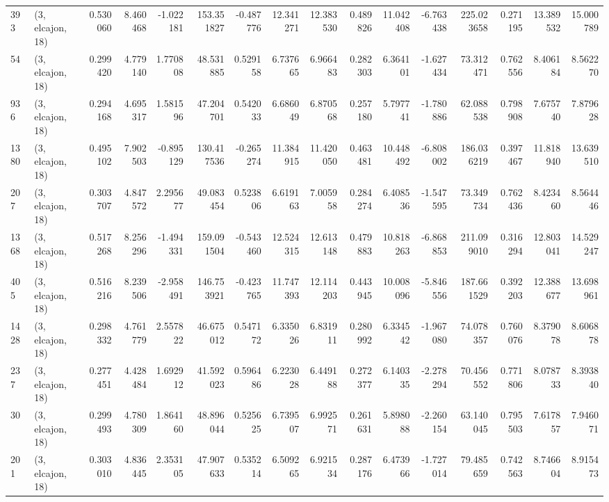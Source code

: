\begin{tabular}{llrrrrrrrrrrrrrr}
393  &  (3, elcajon, 18) &   0.530060 &   8.460468 &  -1.022181 &    153.351827 &   -0.487776 &   12.341271 &   12.383530 &  0.489826 &  11.042408 &  -6.763438 &   225.023658 &   0.271195 &  13.389532 &  15.000789 \\
54   &  (3, elcajon, 18) &   0.299420 &   4.779140 &   1.770808 &     48.531885 &    0.529158 &    6.737665 &    6.966483 &  0.282303 &   6.364101 &  -1.627434 &    73.312471 &   0.762556 &   8.406184 &   8.562270 \\
936  &  (3, elcajon, 18) &   0.294168 &   4.695317 &   1.581596 &     47.204701 &    0.542033 &    6.686049 &    6.870568 &  0.257180 &   5.797741 &  -1.780886 &    62.088538 &   0.798908 &   7.675740 &   7.879628 \\
1380 &  (3, elcajon, 18) &   0.495102 &   7.902503 &  -0.895129 &    130.417536 &   -0.265274 &   11.384915 &   11.420050 &  0.463481 &  10.448492 &  -6.808002 &   186.036219 &   0.397467 &  11.818940 &  13.639510 \\
207  &  (3, elcajon, 18) &   0.303707 &   4.847572 &   2.295677 &     49.083454 &    0.523806 &    6.619163 &    7.005958 &  0.284274 &   6.408536 &  -1.547595 &    73.349734 &   0.762436 &   8.423460 &   8.564446 \\
1368 &  (3, elcajon, 18) &   0.517268 &   8.256296 &  -1.494331 &    159.091504 &   -0.543460 &   12.524315 &   12.613148 &  0.479883 &  10.818263 &  -6.868853 &   211.099010 &   0.316294 &  12.803041 &  14.529247 \\
405  &  (3, elcajon, 18) &   0.516216 &   8.239506 &  -2.958491 &    146.753921 &   -0.423765 &   11.747393 &   12.114203 &  0.443945 &  10.008096 &  -5.846556 &   187.661529 &   0.392203 &  12.388677 &  13.698961 \\
1428 &  (3, elcajon, 18) &   0.298332 &   4.761779 &   2.557822 &     46.675012 &    0.547172 &    6.335026 &    6.831911 &  0.280992 &   6.334542 &  -1.967080 &    74.078357 &   0.760076 &   8.379078 &   8.606878 \\
237  &  (3, elcajon, 18) &   0.277451 &   4.428484 &   1.692912 &     41.592023 &    0.596486 &    6.223028 &    6.449188 &  0.272377 &   6.140335 &  -2.278294 &    70.456552 &   0.771806 &   8.078733 &   8.393840 \\
30   &  (3, elcajon, 18) &   0.299493 &   4.780309 &   1.864160 &     48.896044 &    0.525625 &    6.739507 &    6.992571 &  0.261631 &   5.898088 &  -2.260154 &    63.140045 &   0.795503 &   7.617857 &   7.946071 \\
201  &  (3, elcajon, 18) &   0.303010 &   4.836445 &   2.353105 &     47.907633 &    0.535214 &    6.509265 &    6.921534 &  0.287176 &   6.473966 &  -1.727014 &    79.485659 &   0.742563 &   8.746604 &   8.915473 \\

\end{tabular}
